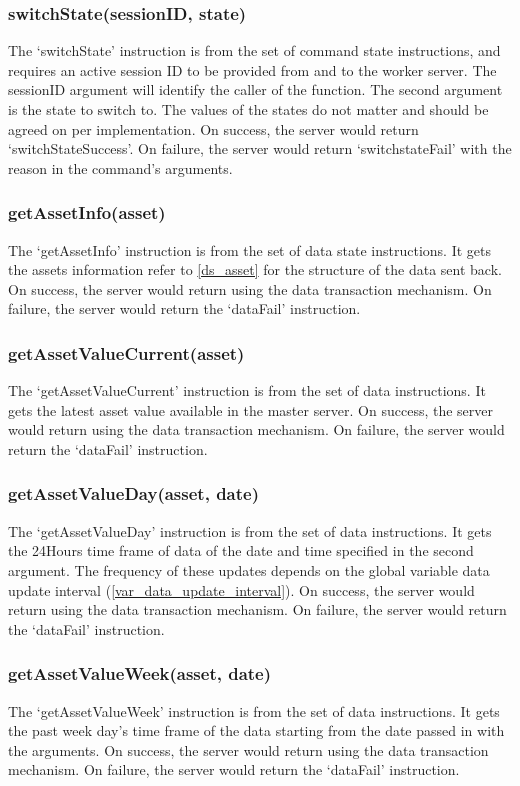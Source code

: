 \documentclass[a4paper]{article}
\begin{document}
\subsubsection{switchState(sessionID, state)}
The `switchState' instruction is from the set of command state instructions,
and requires an active session ID to be provided from and to the worker server.
The sessionID argument will identify the caller of the function. The second
argument is the state to switch to. The values of the states do not matter and
should be agreed on per implementation. On success, the server would return 
`switchStateSuccess'. On failure, the server would return `switchstateFail'
with the reason in the command's arguments.

\subsubsection{getAssetInfo(asset)}
The `getAssetInfo' instruction is from the set of data state instructions. It
gets the assets information refer to \ref{ds_asset} for the structure of the
data sent back. On success, the server would return using the data transaction
mechanism. On failure, the server would return the `dataFail' instruction.

\subsubsection{getAssetValueCurrent(asset)}
The `getAssetValueCurrent' instruction is from the set of data instructions. It
gets the latest asset value available in the master server. On success, the
server would return using the data transaction mechanism. On failure, the
server would return the `dataFail' instruction.

\subsubsection{getAssetValueDay(asset, date)}
The `getAssetValueDay' instruction is from the set of data instructions. It
gets the 24Hours time frame of data of the date and time specified in the
second argument. The frequency of these updates depends on the global variable
data update interval (\ref{var_data_update_interval}). On success, the server
would return using the data transaction mechanism. On failure, the server would
return the `dataFail' instruction.

\subsubsection{getAssetValueWeek(asset, date)}
The `getAssetValueWeek' instruction is from the set of data instructions. It
gets the past week day's time frame of the data starting from the date passed 
in with the arguments. On success, the server would return using the data 
transaction mechanism. On failure, the server would return the `dataFail' 
instruction.
\end{document}
